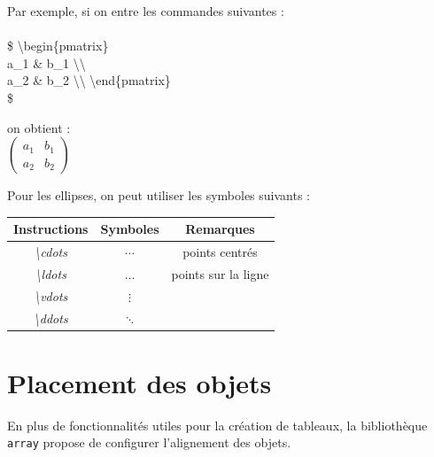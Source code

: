 \documentclass[a4paper, 10pt]{book}
\begin{document}
Par exemple, si on entre les commandes suivantes : \\

\textsf{
\\
\$ \textbackslash begin\{pmatrix\}\\
    a\_1 \& b\_1 \textbackslash \textbackslash \\
    a\_2 \& b\_2 \textbackslash \textbackslash 
\textbackslash end\{pmatrix\}\\ \$
}
\vspace{0.5 cm}

on obtient : \\

\vspace{0.5 cm}
$
\begin{pmatrix}
   a_1 & b_1 \\
   a_2 & b_2 
\end{pmatrix} $
\vspace{0.5 cm}

Pour les ellipses, on peut utiliser les symboles suivants : \\

\vspace{0.5 cm}
\begin{table}[h]
    \centering
    \begin{tabular}{||c|c|c||}
        \hline \hline
        \textbf{Instructions} & \textbf{Symboles} & Remarques  \\
        \hline \hline
        \textit{\textbackslash cdots} & $\cdots$ & points centrés \\ 
        \hline
        \textit{\textbackslash ldots} & $\ldots$ & points sur la ligne \\
        \hline
        \textit{\textbackslash vdots} & $\vdots$ & \\
        \hline 
        \textit{\textbackslash  ddots} & $\ddots $ & \\
        \hline \hline
    \end{tabular}
\end{table}
\vspace{0.8 cm}

\section{Placement des objets}
\vspace{0.5 cm}

En plus de fonctionnalités utiles pour la création de tableaux, la bibliothèque \texttt{array} propose de configurer l'alignement des objets.
\end{document}
